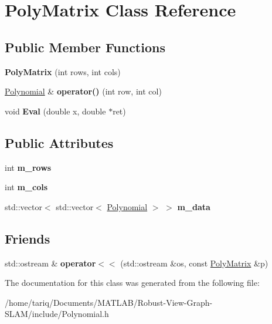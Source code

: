 \hypertarget{classPolyMatrix}{}\section{Poly\+Matrix Class Reference}
\label{classPolyMatrix}
\subsection*{Public Member Functions}
\begin{DoxyCompactItemize}
\item 
{\bfseries Poly\+Matrix} (int rows, int cols)\hypertarget{classPolyMatrix_ac93ab07429acd1c7121bbe28f27fc7d1}{}\label{classPolyMatrix_ac93ab07429acd1c7121bbe28f27fc7d1}

\item 
\hyperlink{classPolynomial}{Polynomial} \& {\bfseries operator()} (int row, int col)\hypertarget{classPolyMatrix_aaa9b3c90712f4c2164b66f9651b5b3f8}{}\label{classPolyMatrix_aaa9b3c90712f4c2164b66f9651b5b3f8}

\item 
void {\bfseries Eval} (double x, double $\ast$ret)\hypertarget{classPolyMatrix_a0ca0aef742c645d0a4939d7c57fffdaf}{}\label{classPolyMatrix_a0ca0aef742c645d0a4939d7c57fffdaf}

\end{DoxyCompactItemize}
\subsection*{Public Attributes}
\begin{DoxyCompactItemize}
\item 
int {\bfseries m\+\_\+rows}\hypertarget{classPolyMatrix_ad712044158b69bcfb7b0ddc00833e7af}{}\label{classPolyMatrix_ad712044158b69bcfb7b0ddc00833e7af}

\item 
int {\bfseries m\+\_\+cols}\hypertarget{classPolyMatrix_a5cca7b71143efc040cd380de4d0defce}{}\label{classPolyMatrix_a5cca7b71143efc040cd380de4d0defce}

\item 
std\+::vector$<$ std\+::vector$<$ \hyperlink{classPolynomial}{Polynomial} $>$ $>$ {\bfseries m\+\_\+data}\hypertarget{classPolyMatrix_a4290f16939adce36dfc4dbf0cd3ca3bc}{}\label{classPolyMatrix_a4290f16939adce36dfc4dbf0cd3ca3bc}

\end{DoxyCompactItemize}
\subsection*{Friends}
\begin{DoxyCompactItemize}
\item 
std\+::ostream \& {\bfseries operator$<$$<$} (std\+::ostream \&os, const \hyperlink{classPolyMatrix}{Poly\+Matrix} \&p)\hypertarget{classPolyMatrix_a972de29f696a52bdd12c8c3e8499501b}{}\label{classPolyMatrix_a972de29f696a52bdd12c8c3e8499501b}

\end{DoxyCompactItemize}


The documentation for this class was generated from the following file\+:\begin{DoxyCompactItemize}
\item 
/home/tariq/\+Documents/\+M\+A\+T\+L\+A\+B/\+Robust-\/\+View-\/\+Graph-\/\+S\+L\+A\+M/include/Polynomial.\+h\end{DoxyCompactItemize}
